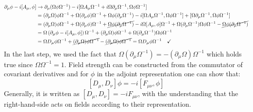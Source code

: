 \documentclass[../main.tex]{subfiles}
\begin{document}
\begin{align*}
\partial_\mu\phi-i[A_\mu,\phi]&\to\partial_\mu(\Omega\phi\Omega^{-1})-i[\Omega A_\mu\Omega^{-1}+i\Omega\partial_\mu\Omega^{-1},\Omega\phi\Omega^{-1}]\\
&=(\partial_\mu\Omega)\phi\Omega^{-1}+\Omega(\partial_\mu\phi)\Omega^{-1}+\Omega\phi(\partial_\mu\Omega^{-1})-i[\Omega A_\mu\Omega^{-1},\Omega\phi\Omega^{-1}]+[\Omega \partial_\mu\Omega^{-1},\Omega\phi\Omega^{-1}]\\
&=(\partial_\mu\Omega)\phi\Omega^{-1}+\Omega(\partial_\mu\phi)\Omega^{-1}+\cancel{\Omega\phi(\partial_\mu\Omega^{-1})}-i\Omega[A_\mu,\phi]\Omega^{-1}+\Omega(\partial_\mu\Omega^{-1})\Omega\phi\Omega^{-1}-\cancel{\Omega\phi(\partial_\mu\Omega^{-1})}\\
&=\Omega\left(\partial_\mu\phi-i[A_\mu,\phi]\right)\Omega^{-1}+(\partial_\mu\Omega)\phi\Omega^{-1}+\Omega(\partial_\mu\Omega^{-1})\Omega\phi\Omega^{-1}\\
&=\Omega D_\mu\phi\Omega^{-1}+\cancel{(\partial_\mu\Omega)\phi\Omega^{-1}}-\cancel{(\partial_\mu\Omega)\phi\Omega^{-1}}=\Omega D_\mu\phi\Omega^{-1} \quad \checkmark
\end{align*}
In the last step, we used the fact that $\Omega(\partial_\mu\Omega^{-1})=-(\partial_\mu\Omega)\Omega^{-1}$ which holds true since $\Omega\Omega^{-1}=1$. Field strength can be constructed from the commutator of covariant derivatives and for $\phi$ in the adjoint representation one can show that:
\[
[D_\mu,D_\nu]\phi=-i[F_{\mu\nu},\phi]
\]
Generally, it is written as $[D_\mu,D_\nu]=-iF_{\mu\nu}$, with the understanding that
the right-hand-side acts on fields according to their representation.
\end{document}

